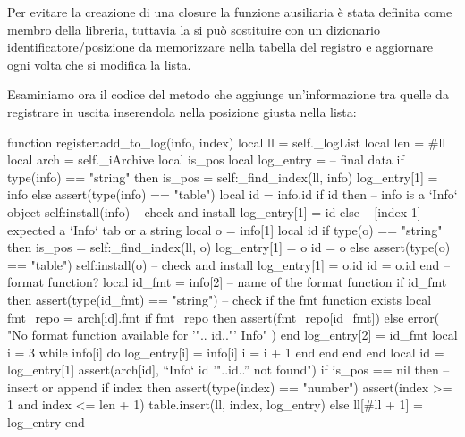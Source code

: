 Per evitare la creazione di una closure la funzione ausiliaria è stata definita
come membro della libreria, tuttavia la si può sostituire con un dizionario
identificatore/posizione da memorizzare nella tabella del registro e aggiornare
ogni volta che si modifica la lista.

Esaminiamo ora il codice del metodo  che aggiunge
un'informazione tra quelle da registrare in uscita inserendola nella posizione
giusta nella lista:
\begin{lines}
function register:add_to_log(info, index)
    local ll = self._logList
    local len = #ll
    local arch = self._iArchive
    local is_pos
    local log_entry = {} -- final data
    if type(info) == "string" then
        is_pos = self:_find_index(ll, info)
        log_entry[1] = info
    else
        assert(type(info) == "table")
        local id = info.id
        if id then -- info is a `Info` object
            self:install(info) -- check and install
            log_entry[1] = id
        else
            -- [index 1] expected a `Info` tab or a string
            local o = info[1]
            local id
            if type(o) == "string" then
                is_pos = self:_find_index(ll, o)
                log_entry[1] = o
                id = o
            else
                assert(type(o) == "table")
                self:install(o) -- check and install
                log_entry[1] = o.id
                id = o.id
            end
            -- format function?
            local id_fmt = info[2] -- name of the format function
            if id_fmt then
                assert(type(id_fmt) == "string")
                -- check if the fmt function exists
                local fmt_repo = arch[id].fmt
                if fmt_repo then
                    assert(fmt_repo[id_fmt])
                else
                    error(
                        "No format function available for '"..
                        id.."' Info"
                    )
                end
                log_entry[2] = id_fmt
                local i = 3
                while info[i] do
                    log_entry[i] = info[i]
                    i = i + 1
                end
            end
        end
    end
    local id = log_entry[1]
    assert(arch[id], "`Info` id '"..id.."' not found")
    if is_pos == nil then -- insert or append
        if index then
            assert(type(index) == "number")
            assert(index >= 1 and index <= len + 1)
            table.insert(ll, index, log_entry)
        else
            ll[#ll + 1] = log_entry
        end

\end{lines}
